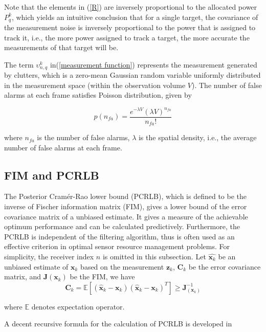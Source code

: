 \documentclass[12pt,journal,draftclsnofoot,onecolumn]{IEEEtran}
\begin{document}
Note that the elements in (\ref{R}) are inversely proportional to the allocated power $P_{q}^k$, which yields an intuitive conclusion that for a single target, the covariance of the measurement noise is inversely proportional to the power that is assigned to track it, i.e., the more power assigned to track a target, the more accurate the measurements of that target will be.

The term $\upsilon_{n,q}^k$ in(\ref{measurement function}) represents the measurement generated by clutters, which is a zero-mean Gaussian random variable uniformly distributed in the measurement space (within the observation volume $V$). The number of false alarms at each frame satisfies Poisson distribution, given by 

\begin{equation}
	p(n_{fa})=\frac{e^{-\lambda V}(\lambda V)^{n_{fa}}}{n_{fa}!}
\end{equation} 

where $n_{fa}$ is the number of false alarms, $\lambda$ is the spatial density, i.e., the average number of false alarms at each frame.

\subsection{FIM and PCRLB}
The Posterior Cramér-Rao lower bound (PCRLB), which is defined to be the inverse of Fischer information matrix (FIM), gives a lower bound of the error covariance matrix of a unbiased estimate. It gives a measure of the achievable optimum performance and can be calculated
predictively. Furthermore, the PCRLB is independent of the filtering algorithm, thus is often used as an effective criterion in optimal sensor resource management problems. For simplicity, the receiver index $n$ is omitted in this subsection. Let $\hat{\mathbf{x}_k}$ be an unbiased estimate of $\mathbf{x}_k$ based on the measurement $\mathbf{z}_k$, $\mathbf{C}_k$ be the error covariance matrix, and $\mathbf{J}(\mathbf{x}_k)$ be the FIM, we have 
\begin{equation}
    \mathbf{C}_k=\mathbb{E}[(\hat{\mathbf{x}}_k-\mathbf{x}_k)(\hat{\mathbf{x}}_k-\mathbf{x}_k)^{T}]\geq \mathbf{J}_(\mathbf{x}_k)^{-1}
\end{equation}

where $\mathbb{E}$ denotes expectation operator.

A decent recursive formula for the calculation of PCRLB is developed in\cite{tichavsky1998posterior}
\end{document}

